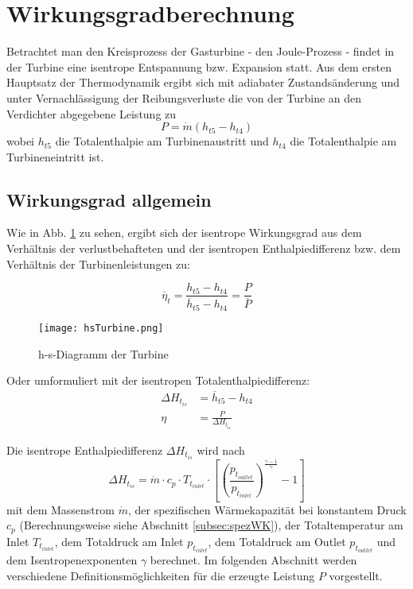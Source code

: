 \section{Wirkungsgradberechnung}
\label{sec:wgberechnung}
Betrachtet man den Kreisprozess der Gasturbine - den Joule-Prozess - findet in der Turbine eine isentrope Entspannung bzw. Expansion statt. Aus dem ersten Hauptsatz der Thermodynamik ergibt sich mit adiabater Zustandsänderung und unter Vernachlässigung der Reibungsverluste die von der Turbine an den Verdichter abgegebene Leistung zu
\begin{equation}
\label{eq:leistungTurbine}
P = \dot m (h_{t5} - h_{t4})
\end{equation}
wobei $h_{t5}$ die Totalenthalpie am Turbinenaustritt und $h_{t4}$ die Totalenthalpie am Turbineneintritt ist. 



\subsection{Wirkungsgrad allgemein}

Wie in Abb. \ref{fig:hsTurbine} zu sehen, ergibt sich der isentrope Wirkungsgrad aus dem Verhältnis der verlustbehafteten und der isentropen Enthalpiedifferenz bzw. dem Verhältnis der Turbinenleistungen zu:

\begin{equation}
\label{eq:leistungTurbine}
\overline{\eta}_{t} = \frac{h_{t5} - h_{t4}}{\overline{h}_{t5} - h_{t4}} =  \frac{P}{ \overline{P}} 
\end{equation}

\begin{figure}[htbp]
	\centering
	\texttt{[image: hsTurbine.png]}
	\caption{h-s-Diagramm der Turbine \cite[p. 42]{GLR-Skript}} \label{fig:hsTurbine}
	
\end{figure} 

Oder umformuliert mit der isentropen Totalenthalpiedifferenz:
\begin{align}
\Delta H_{t_{is}} &= \overline{h}_{t5} - h_{t4}\\
\label{eq:wgallgemein}
\eta &=\frac{P}{\Delta H_{t_{is}}}
\end{align}

Die isentrope Enthalpiedifferenz $\Delta H_{t_{is}}$ wird nach
\begin{equation}
\label{eq:wgnenner}
\Delta H_{t_{is}} = \dot m \cdot c_p \cdot T_{t_{inlet}} \cdot \left[ \left( \frac{p_{t_{outlet}}}{p_{t_{inlet}}}\right)^\frac{\gamma-1}{\gamma}-1\right]
\end{equation}
mit dem Massenstrom $\dot m$, der spezifischen Wärmekapazität bei konstantem Druck $c_p$ (Berechnungsweise siehe Abschnitt \ref{subsec:spezWK}), der Totaltemperatur am Inlet $T_{t_{inlet}}$, dem Totaldruck am Inlet $p_{t_{inlet}}$, dem Totaldruck am Outlet $p_{t_{outlet}}$ und dem Isentropenexponenten $\gamma$ berechnet.\newline 
Im folgenden Abschnitt werden verschiedene Definitionsmöglichkeiten für die erzeugte Leistung $P$ vorgestellt.
